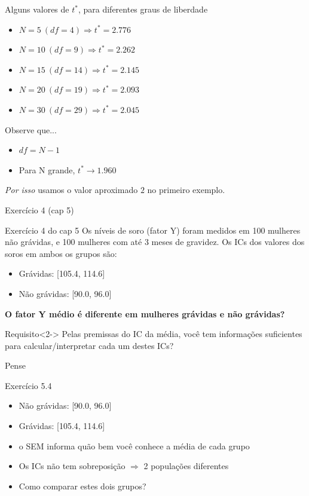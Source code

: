 \documentclass{beamer}
\begin{document}
\begin{frame}{Alguns valores de $t^{*}$, para diferentes graus de liberdade}
  \begin{itemize}
  \item $N = 5\ (df = 4) \Rightarrow t^{*} = 2.776$
  \item $N = 10\ (df = 9) \Rightarrow t^{*} = 2.262$
  \item $N = 15\ (df = 14) \Rightarrow t^{*} = 2.145$
  \item $N = 20\ (df = 19) \Rightarrow t^{*} = 2.093$
  \item $N = 30\ (df = 29) \Rightarrow t^{*} = 2.045$
  \end{itemize}
  \begin{block}{Observe que...}
    \begin{itemize}
    \item $df = N - 1$
    \item Para N  grande, $t^{*} \rightarrow 1.960$
    \end{itemize}
    {\em Por isso} usamos o valor aproximado $2$ no primeiro exemplo.
  \end{block}
\end{frame}

\begin{frame}[label=exercicio5.4]{Exercício 4 (cap 5)}
  \begin{exampleblock}{Exercício 4 do cap 5}
    Os níveis de soro (fator Y) foram medidos em 100 mulheres não grávidas, e 100 mulheres com até 3 meses de gravidez.
    Os ICs dos valores dos soros em ambos os grupos são:
    \begin{itemize}
    \item Grávidas: [105.4, 114.6]
    \item Não grávidas: [90.0, 96.0]
    \end{itemize}

    \bigskip
    {\bf O fator Y médio é diferente em mulheres grávidas e não grávidas?}
  \end{exampleblock}
  \begin{block}{Requisito}<2->
    Pelas premissas do IC da média, você tem informações suficientes para calcular/interpretar cada um destes ICs?
  \end{block}
\end{frame}

\begin{frame}{Pense}
  \begin{exampleblock}{Exercício 5.4}
    \begin{itemize}
    \item Não grávidas: [90.0, 96.0]
    \item Grávidas: [105.4, 114.6]
    \end{itemize}
  \end{exampleblock}
  \begin{itemize}
  \item o SEM informa quão bem você conhece a média de cada grupo
  \item Os ICs não tem sobreposição $\Rightarrow$ 2 populações diferentes
  \item Como comparar estes dois grupos?
  \end{itemize}
\end{frame}
\end{document}
